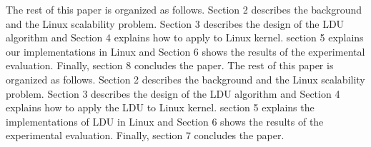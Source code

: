 \fi


\ifkor
The rest of this paper is organized as follows.
Section 2 describes the background and the Linux scalability problem.
Section 3 describes the design of the LDU algorithm and 
Section 4 explains how to apply to Linux kernel.
section 5 explains our implementations in Linux and
Section 6 shows the results of the experimental evaluation. 
Finally, section 8 concludes the paper.
\else
The rest of this paper is organized as follows.
Section 2 describes the background and the Linux scalability problem.
Section 3 describes the design of the LDU algorithm and 
Section 4 explains how to apply the LDU to Linux kernel.
section 5 explains the implementations of LDU in Linux and
Section 6 shows the results of the experimental evaluation. 
Finally, section 7 concludes the paper.
\fi

%
%






